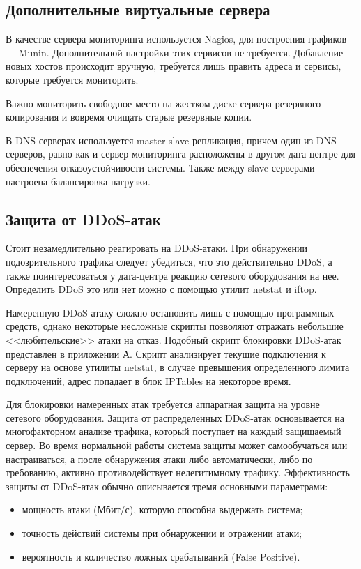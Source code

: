 \subsection{Дополнительные виртуальные сервера}

В качестве сервера мониторинга используется Nagios, для построения графиков --- Munin.
Дополнительной настройки этих сервисов не требуется.
Добавление новых хостов происходит вручную, требуется лишь править адреса и сервисы, которые требуется мониторить.

Важно мониторить свободное место на жестком диске сервера резервного копирования и вовремя очищать старые резервные копии.

В DNS серверах используется master-slave репликация, причем один из DNS-серверов, равно как и сервер мониторинга расположены в другом дата-центре для обеспечения отказоустойчивости системы.
Также между slave-серверами настроена балансировка нагрузки.

\subsection{Защита от DDoS-атак}

Стоит незамедлительно реагировать на DDoS-атаки.
При обнаружении подозрительного трафика следует убедиться, что это действительно DDoS, а также поинтересоваться у дата-центра реакцию сетевого оборудования на нее.
Определить DDoS это или нет можно с помощью утилит netstat и iftop.

Намеренную DDoS-атаку сложно остановить лишь с помощью программных средств, однако некоторые несложные скрипты позволяют отражать небольшие <<любительские>> атаки на отказ.
Подобный скрипт блокировки DDoS-атак представлен в приложении А.
Скрипт анализирует текущие подключения к серверу на основе утилиты netstat, в случае превышения определенного лимита подключений, адрес попадает в блок IPTables на некоторое время.

Для блокировки намеренных атак требуется аппаратная защита на уровне сетевого оборудования.
Защита от распределенных DDoS-атак основывается на мно­го­фак­тор­ном анализе трафика, который поступает на каждый защищаемый сервер.
Во время нормальной работы система защиты может самообучаться или настраиваться, а после обнаружения атаки либо автоматически, либо по требованию, активно про­тиво­дей­ству­ет нелегитимному трафику.
Эффективность защиты от DDoS-атак обычно описывается тремя основными параметрами:
\begin{itemize}
  \item мощность атаки (Мбит/с), которую способна выдержать система;
  \item точность действий системы при обнаружении и отражении атаки;
  \item вероятность и количество ложных срабатываний (False Positive).
\end{itemize}

